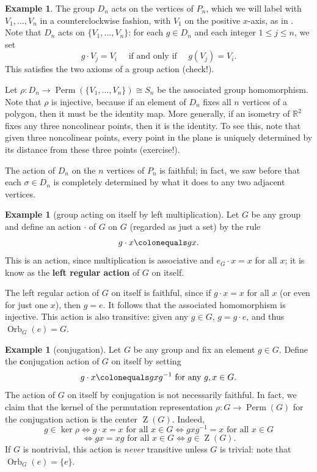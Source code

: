 \documentclass[12pt]{report}
\numberwithin{equation}{section}
\numberwithin{theorem}{chapter}
\theoremstyle{definition}
\newtheorem{example}[theorem]{Example}
\newtheorem*{basic properties}{Basic Properties}
\newtheorem*{Important Remark}{Important Remark}
\newcommand{\df}[1]{{\bf #1}\index{#1}}
\DeclareMathOperator{\Perm}{Perm}
\newcommand{\R}{\mathbb{R}}
\renewcommand{\ker}{\operatorname{ker}}
\DeclareMathOperator{\Orb}{Orb}
\DeclareMathOperator{\Zc}{Z}
\begin{document}
\begin{example} 
The group $D_{n}$ acts on the vertices of $P_n$, which we will label with $V_1, \dots, V_{n}$ in a counterclockwise fashion, with $V_1$ on the positive $x$-axis, as in .
Note that $D_{n}$ acts on $\{V_1, \dots, V_n \}$: for each $g \in D_{n}$ and each integer $1 \leqslant j \leqslant n$, we set 
$$g \cdot V_j = V_i \quad \textrm{ if and only if } \quad g(V_j)=V_i.$$
This satisfies the two axioms of a group action (check!).

Let $\rho\!: D_{n} \to \Perm\left(\{V_1,\ldots,V_n\}\right)\cong S_n$ be the associated group homomorphism. Note that $\rho$ is injective, because if an element  of $D_{n}$ fixes all $n$ vertices of a polygon, then it must be the identity map. More generally, if an isometry of $\R^2$ fixes any three noncolinear points, then it is the identity. To see this, note that given three noncolinear points, every point in the plane is uniquely determined by its distance from these three points (exercise!).

The action of $D_{n}$ on the $n$ vertices of $P_n$ is faithful; in fact, we saw before that each $\sigma \in D_n$ is completely determined by what it does to any two adjacent vertices.
\end{example}


\begin{example}[group acting on itself by left multiplication]
Let $G$ be any group and define an action $\cdot$ of $G$ on $G$ (regarded as just a set) by the rule
$$g \cdot x \colonequals g  x.$$
This is an action, since multiplication is associative and $e_G \cdot x = x$ for all $x$; it is know as the \df{left regular action} of $G$ on itself.

The left regular action of $G$ on itself is faithful, since if $g \cdot x = x$ for all $x$ (or even for just one $x$), then $g = e$. It follows that the associated homomorphism is injective.
This action is also transitive: given any $g \in G$, $g = g \cdot e$, and thus $\Orb_G(e) = G$.
\end{example}



\begin{example}[conjugation]
Let $G$ be any group and fix an element $g \in G$. Define the {\df conjugation action} of $G$ on itself by setting
$$g\cdot x \colonequals gxg^{-1} \textrm{ for any } g,x\in G.$$
The action of $G$ on itself by conjugation is  not necessarily faithful. In fact, we claim that the kernel of the permutation representation $\rho\!:G\to \Perm(G)$ for the conjugation action is the center $\Zc(G)$. Indeed,
$$g\in \ker\rho\iff g\cdot x=x \textrm{ for all } x\in G \iff gxg^{-1}=x \textrm{ for all } x\in G$$
$$ \iff gx=xg \textrm{ for all } x\in G \iff g\in \Zc(G). $$
If $G$ is nontrivial, this action is \emph{never} transitive unless $G$ is trivial: note that $\Orb_G(e) = \{ e \}$.
\end{example}
\end{document}
